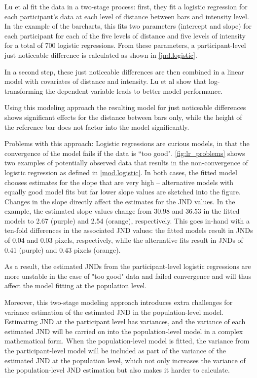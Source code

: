 Lu et al fit the data in a two-stage process: 
first, they fit a logistic regression for each participant's data at each level of distance between bars and intensity level. In the example of the barcharts, this fits two parameters (intercept and slope) for each participant for each of the five levels of distance and five levels of intensity for a total of 700 logistic regressions. From these parameters, a participant-level just noticeable difference is calculated as shown in \autoref{jnd.logistic}.

In a second step, these just noticeable differences are then combined in a linear model with covariates of distance and intensity. Lu et al show that log-transforming the dependent variable leads to better model performance. 

Using this modeling approach the resulting model for just noticeable differences shows significant effects for the distance between bars only, while the height of the reference bar does not factor into the model significantly.

Problems with this approach:
Logistic regressions are curious models, in that the convergence of the model fails if the data is ``too good". 
\autoref{fig:lr_problems} shows two examples of potentially observed data that results in the non-convergence of logistic regression as defined in \autoref{mod.logistic}. 
In both cases, the fitted model chooses estimates for the slope that are very high -- alternative models with equally good model fits but far lower slope values are sketched into the figure. 
Changes in the slope directly affect the estimates for the JND values. 
In the example, the estimated slope values change from 30.98 and 36.53 in the fitted models to 2.67 (purple) and 2.54 (orange), respectively. 
This goes in-hand with a ten-fold differences in the associated JND values: the fitted models result in JNDs of 0.04 and 0.03 pixels, respectively, while the alternative fits result in JNDs of 0.41 (purple) and 0.43 pixels (orange).

As a result, the estimated JNDs from the participant-level logistic regressions are more unstable in the case of "too good" data and failed convergence and will thus affect the model fitting at the population level.

Moreover, this two-stage modeling approach introduces extra challenges for variance estimation of the estimated JND in the population-level model. 
Estimating JND at the participant level has variances, and the variance of each estimated JND will be carried on into the population-level model in a complex mathematical form. When the population-level model is fitted, the variance from the participant-level model will be included as part of the variance of the estimated JND at the population level, which not only increases the variance of the population-level JND estimation but also makes it harder to calculate.  





